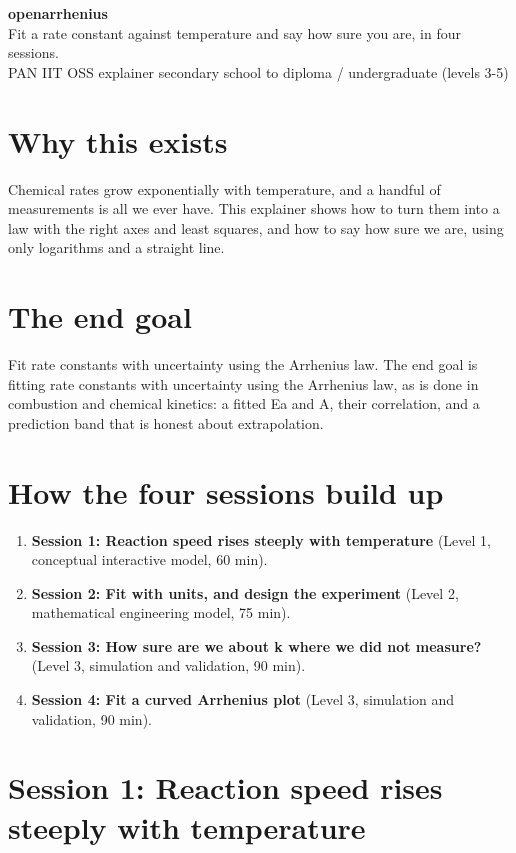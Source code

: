 \documentclass[11pt,a4paper]{article}
\begin{document}
\begin{center}{\LARGE\bfseries openarrhenius}\\[0.4em]{\large Fit a rate constant against temperature and say how sure you are, in four sessions.}\\[0.2em]\small PAN IIT OSS explainer \textbullet{} secondary school to diploma / undergraduate (levels 3-5)\end{center}

\section*{Why this exists}
Chemical rates grow exponentially with temperature, and a handful of measurements is all we ever have. This explainer shows how to turn them into a law with the right axes and least squares, and how to say how sure we are, using only logarithms and a straight line.

\section*{The end goal}
Fit rate constants with uncertainty using the Arrhenius law. The end goal is fitting rate constants with uncertainty using the Arrhenius law, as is done in combustion and chemical kinetics: a fitted Ea and A, their correlation, and a prediction band that is honest about extrapolation.

\section*{How the four sessions build up}
\begin{enumerate}[nosep]
\item \textbf{Session 1: Reaction speed rises steeply with temperature} (Level 1, conceptual interactive model, 60 min).
\item \textbf{Session 2: Fit with units, and design the experiment} (Level 2, mathematical engineering model, 75 min).
\item \textbf{Session 3: How sure are we about k where we did not measure?} (Level 3, simulation and validation, 90 min).
\item \textbf{Session 4: Fit a curved Arrhenius plot} (Level 3, simulation and validation, 90 min).
\end{enumerate}

\section{Session 1: Reaction speed rises steeply with temperature}
\end{document}
